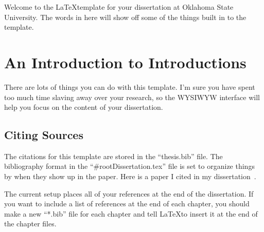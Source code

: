 Welcome to the \LaTeX template for your dissertation at Oklahoma State University.  The words in here will show off some of the things built in to the template.

\section{An Introduction to Introductions}

There are lots of things you can do with this template.  I'm sure you have spent too much time slaving away over your research, so the WYSIWYW interface will help you focus on the content of your dissertation.

\subsection{Citing Sources}

The citations for this template are stored in the ``thesis.bib'' file.  The bibliography format in the ``\#rootDissertation.tex'' file is set to organize things by when they show up in the paper.  Here is a paper I cited in my dissertation~\cite{arrhenius_xxxi._1896}.

The current setup places all of your references at the end of the dissertation.  If you want to include a list of references at the end of each chapter, you should make a new ``*.bib'' file for each chapter and tell \LaTeX to insert it at the end of the chapter files.




